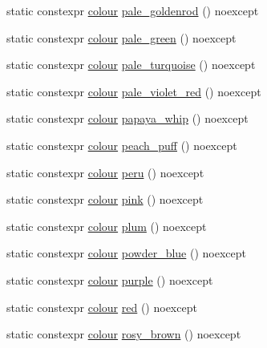 \begin{DoxyCompactItemize}
\item 
static constexpr \mbox{\hyperlink{classmoka_1_1colour}{colour}} \mbox{\hyperlink{classmoka_1_1colour_a258f63765e7938cef739980ffca65a8b}{pale\+\_\+goldenrod}} () noexcept
\item 
static constexpr \mbox{\hyperlink{classmoka_1_1colour}{colour}} \mbox{\hyperlink{classmoka_1_1colour_a7945c8658d3ea970de965adb1e1bdc4b}{pale\+\_\+green}} () noexcept
\item 
static constexpr \mbox{\hyperlink{classmoka_1_1colour}{colour}} \mbox{\hyperlink{classmoka_1_1colour_a17f2b2cbdbf81c008b0ce8749938adb4}{pale\+\_\+turquoise}} () noexcept
\item 
static constexpr \mbox{\hyperlink{classmoka_1_1colour}{colour}} \mbox{\hyperlink{classmoka_1_1colour_ad1eb86dfd7ae69aff716e8382b485fb8}{pale\+\_\+violet\+\_\+red}} () noexcept
\item 
static constexpr \mbox{\hyperlink{classmoka_1_1colour}{colour}} \mbox{\hyperlink{classmoka_1_1colour_af2a0d1b024940bd4e96aa2a3646ee3e3}{papaya\+\_\+whip}} () noexcept
\item 
static constexpr \mbox{\hyperlink{classmoka_1_1colour}{colour}} \mbox{\hyperlink{classmoka_1_1colour_a3deed650e8a98223fa851c43bfed4b30}{peach\+\_\+puff}} () noexcept
\item 
static constexpr \mbox{\hyperlink{classmoka_1_1colour}{colour}} \mbox{\hyperlink{classmoka_1_1colour_a12542a9ad99c5eb16b9b8ddb33d29936}{peru}} () noexcept
\item 
static constexpr \mbox{\hyperlink{classmoka_1_1colour}{colour}} \mbox{\hyperlink{classmoka_1_1colour_a983e2c19732e81d021a037475ea2289b}{pink}} () noexcept
\item 
static constexpr \mbox{\hyperlink{classmoka_1_1colour}{colour}} \mbox{\hyperlink{classmoka_1_1colour_a5fa6c66f8f6d7415c1b06e64eab4a72f}{plum}} () noexcept
\item 
static constexpr \mbox{\hyperlink{classmoka_1_1colour}{colour}} \mbox{\hyperlink{classmoka_1_1colour_a6a297bbcd3fa6afa2c7e58c0a5015e94}{powder\+\_\+blue}} () noexcept
\item 
static constexpr \mbox{\hyperlink{classmoka_1_1colour}{colour}} \mbox{\hyperlink{classmoka_1_1colour_af0e9e47e97a2b81d006c11077715786b}{purple}} () noexcept
\item 
static constexpr \mbox{\hyperlink{classmoka_1_1colour}{colour}} \mbox{\hyperlink{classmoka_1_1colour_afda874e3c56a02d95685b4f11515a130}{red}} () noexcept
\item 
static constexpr \mbox{\hyperlink{classmoka_1_1colour}{colour}} \mbox{\hyperlink{classmoka_1_1colour_a7d35dcc77038c5ee24eb2d5f7bc7d071}{rosy\+\_\+brown}} () noexcept

\end{DoxyCompactItemize}
